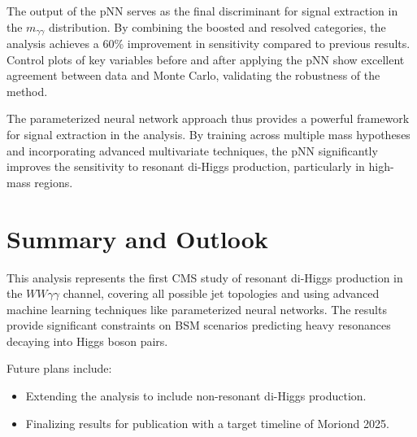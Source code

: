 The output of the pNN serves as the final discriminant for signal extraction in the \(m_{\gamma\gamma}\) distribution. By combining the boosted and resolved categories, the analysis achieves a 60\% improvement in sensitivity compared to previous results. Control plots of key variables before and after applying the pNN show excellent agreement between data and Monte Carlo, validating the robustness of the method.

The parameterized neural network approach thus provides a powerful framework for signal extraction in the \HHWW analysis. By training across multiple mass hypotheses and incorporating advanced multivariate techniques, the pNN significantly improves the sensitivity to resonant di-Higgs production, particularly in high-mass regions.



\section{Summary and Outlook}
This analysis represents the first CMS study of resonant di-Higgs production in the \(WW\gamma\gamma\) channel, covering all possible jet topologies and using advanced machine learning techniques like parameterized neural networks. The results provide significant constraints on BSM scenarios predicting heavy resonances decaying into Higgs boson pairs.

Future plans include:
\begin{itemize}
    \item Extending the analysis to include non-resonant di-Higgs production.
    \item Finalizing results for publication with a target timeline of Moriond 2025.
\end{itemize}
